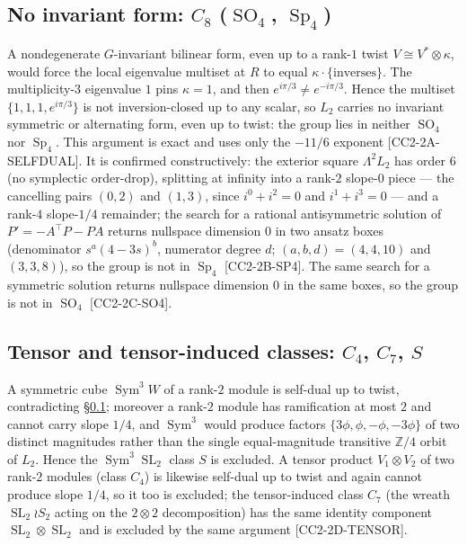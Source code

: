 \documentclass[11pt,reqno]{amsart}
\theoremstyle{plain}
\theoremstyle{definition}
\theoremstyle{remark}
\newcommand{\Z}{\mathbb{Z}}
\newcommand{\SL}{\operatorname{SL}}
\newcommand{\Sp}{\operatorname{Sp}}
\newcommand{\SO}{\operatorname{SO}}
\newcommand{\Sym}{\operatorname{Sym}}
\newcommand{\Ltwo}{L_{2}}
\newcommand{\claim}[1]{\textsf{\small[#1]}}
\begin{document}
\subsection{No invariant form: $C_{8}$ ($\SO_{4}$, $\Sp_{4}$)}
\label{sec:selfdual}
A nondegenerate $G$-invariant bilinear form, even up to a rank-$1$ twist
$V\cong V^{*}\otimes\kappa$, would force the local eigenvalue multiset at $R$ to
equal $\kappa\cdot\{\text{inverses}\}$. The multiplicity-$3$ eigenvalue $1$
pins $\kappa=1$, and then $e^{i\pi/3}\ne e^{-i\pi/3}$. Hence the multiset
$\{1,1,1,e^{i\pi/3}\}$ is not inversion-closed up to any scalar, so $\Ltwo$
carries no invariant symmetric or alternating form, even up to twist: the group
lies in neither $\SO_{4}$ nor $\Sp_{4}$. This argument is exact and uses only
the $-11/6$ exponent \claim{CC2-2A-SELFDUAL}. It is confirmed constructively:
the exterior square $\Lambda^{2}\Ltwo$ has order $6$ (no symplectic
order-drop), splitting at infinity into a rank-$2$ slope-$0$ piece --- the
cancelling pairs $(0,2)$ and $(1,3)$, since $i^{0}+i^{2}=0$ and
$i^{1}+i^{3}=0$ --- and a rank-$4$ slope-$1/4$ remainder; the search for a
rational antisymmetric solution of $P'=-A^{\!\top}P-PA$ returns nullspace
dimension $0$ in two ansatz boxes (denominator $s^{a}(4-3s)^{b}$, numerator
degree $d$; $(a,b,d)=(4,4,10)$ and $(3,3,8)$), so the group is not in
$\Sp_{4}$ \claim{CC2-2B-SP4}. The same search for a symmetric solution returns
nullspace dimension $0$ in the same boxes, so the group is not in $\SO_{4}$
\claim{CC2-2C-SO4}.

\subsection{Tensor and tensor-induced classes: $C_{4}$, $C_{7}$, $S$}
A symmetric cube $\Sym^{3}W$ of a rank-$2$ module is self-dual up to twist,
contradicting \S\ref{sec:selfdual}; moreover a rank-$2$ module has ramification
at most $2$ and cannot carry slope $1/4$, and $\Sym^{3}$ would produce factors
$\{3\phi,\phi,-\phi,-3\phi\}$ of two distinct magnitudes rather than the single
equal-magnitude transitive $\Z/4$ orbit of $\Ltwo$. Hence the $\Sym^{3}\SL_{2}$
class $S$ is excluded. A tensor product $V_{1}\otimes V_{2}$ of two rank-$2$
modules (class $C_{4}$) is likewise self-dual up to twist and again cannot
produce slope $1/4$, so it too is excluded; the tensor-induced class $C_{7}$
(the wreath $\SL_{2}\wr S_{2}$ acting on the $2\otimes2$ decomposition) has the
same identity component $\SL_{2}\otimes\SL_{2}$ and is excluded by the same
argument \claim{CC2-2D-TENSOR}.
\end{document}
